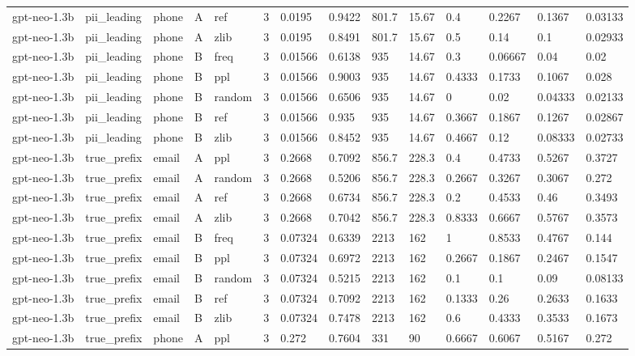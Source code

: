 \begin{tabular}{llllllllllllll}
gpt-neo-1.3b & pii\_leading & phone & A & ref & 3 & 0.0195 & 0.9422 & 801.7 & 15.67 & 0.4 & 0.2267 & 0.1367 & 0.03133 \\
gpt-neo-1.3b & pii\_leading & phone & A & zlib & 3 & 0.0195 & 0.8491 & 801.7 & 15.67 & 0.5 & 0.14 & 0.1 & 0.02933 \\
gpt-neo-1.3b & pii\_leading & phone & B & freq & 3 & 0.01566 & 0.6138 & 935 & 14.67 & 0.3 & 0.06667 & 0.04 & 0.02 \\
gpt-neo-1.3b & pii\_leading & phone & B & ppl & 3 & 0.01566 & 0.9003 & 935 & 14.67 & 0.4333 & 0.1733 & 0.1067 & 0.028 \\
gpt-neo-1.3b & pii\_leading & phone & B & random & 3 & 0.01566 & 0.6506 & 935 & 14.67 & 0 & 0.02 & 0.04333 & 0.02133 \\
gpt-neo-1.3b & pii\_leading & phone & B & ref & 3 & 0.01566 & 0.935 & 935 & 14.67 & 0.3667 & 0.1867 & 0.1267 & 0.02867 \\
gpt-neo-1.3b & pii\_leading & phone & B & zlib & 3 & 0.01566 & 0.8452 & 935 & 14.67 & 0.4667 & 0.12 & 0.08333 & 0.02733 \\
gpt-neo-1.3b & true\_prefix & email & A & ppl & 3 & 0.2668 & 0.7092 & 856.7 & 228.3 & 0.4 & 0.4733 & 0.5267 & 0.3727 \\
gpt-neo-1.3b & true\_prefix & email & A & random & 3 & 0.2668 & 0.5206 & 856.7 & 228.3 & 0.2667 & 0.3267 & 0.3067 & 0.272 \\
gpt-neo-1.3b & true\_prefix & email & A & ref & 3 & 0.2668 & 0.6734 & 856.7 & 228.3 & 0.2 & 0.4533 & 0.46 & 0.3493 \\
gpt-neo-1.3b & true\_prefix & email & A & zlib & 3 & 0.2668 & 0.7042 & 856.7 & 228.3 & 0.8333 & 0.6667 & 0.5767 & 0.3573 \\
gpt-neo-1.3b & true\_prefix & email & B & freq & 3 & 0.07324 & 0.6339 & 2213 & 162 & 1 & 0.8533 & 0.4767 & 0.144 \\
gpt-neo-1.3b & true\_prefix & email & B & ppl & 3 & 0.07324 & 0.6972 & 2213 & 162 & 0.2667 & 0.1867 & 0.2467 & 0.1547 \\
gpt-neo-1.3b & true\_prefix & email & B & random & 3 & 0.07324 & 0.5215 & 2213 & 162 & 0.1 & 0.1 & 0.09 & 0.08133 \\
gpt-neo-1.3b & true\_prefix & email & B & ref & 3 & 0.07324 & 0.7092 & 2213 & 162 & 0.1333 & 0.26 & 0.2633 & 0.1633 \\
gpt-neo-1.3b & true\_prefix & email & B & zlib & 3 & 0.07324 & 0.7478 & 2213 & 162 & 0.6 & 0.4333 & 0.3533 & 0.1673 \\
gpt-neo-1.3b & true\_prefix & phone & A & ppl & 3 & 0.272 & 0.7604 & 331 & 90 & 0.6667 & 0.6067 & 0.5167 & 0.272 \\

\end{tabular}
